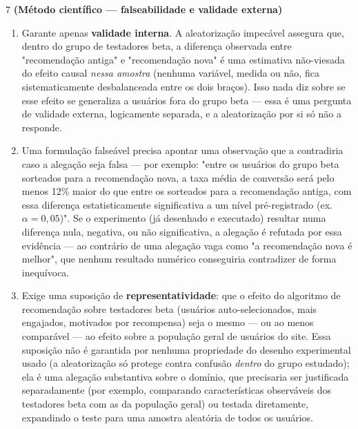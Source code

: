 \documentclass[11pt]{article}
\begin{document}
\begin{questao}{7} \textbf{(Método científico --- falseabilidade e validade externa)}
\end{questao}
\begin{solucao}
\begin{enumerate}[label=(\alph*)]
  \item Garante apenas \textbf{validade interna}. A aleatorização impecável assegura que, dentro
    do grupo de testadores beta, a diferença observada entre "recomendação antiga" e "recomendação
    nova" é uma estimativa não-viesada do efeito causal \emph{nessa amostra} (nenhuma variável,
    medida ou não, fica sistematicamente desbalanceada entre os dois braços). Isso nada diz sobre
    se esse efeito se generaliza a usuários fora do grupo beta --- essa é uma pergunta de validade
    externa, logicamente separada, e a aleatorização por si só não a responde.
  \item Uma formulação falseável precisa apontar uma observação que a contradiria caso a alegação
    seja falsa --- por exemplo: "entre os usuários do grupo beta sorteados para a recomendação
    nova, a taxa média de conversão será pelo menos 12\% maior do que entre os sorteados para a
    recomendação antiga, com essa diferença estatisticamente significativa a um nível pré-registrado
    (ex.\ $\alpha=0{,}05$)". Se o experimento (já desenhado e executado) resultar numa diferença
    nula, negativa, ou não significativa, a alegação é refutada por essa evidência --- ao contrário
    de uma alegação vaga como "a recomendação nova é melhor", que nenhum resultado numérico
    conseguiria contradizer de forma inequívoca.
  \item Exige uma suposição de \textbf{representatividade}: que o efeito do algoritmo de
    recomendação sobre testadores beta (usuários auto-selecionados, mais engajados, motivados por
    recompensa) seja o mesmo --- ou ao menos comparável --- ao efeito sobre a população geral de
    usuários do site. Essa suposição não é garantida por nenhuma propriedade do desenho
    experimental usado (a aleatorização só protege contra confusão \emph{dentro} do grupo estudado);
    ela é uma alegação substantiva sobre o domínio, que precisaria ser justificada separadamente
    (por exemplo, comparando características observáveis dos testadores beta com as da população
    geral) ou testada diretamente, expandindo o teste para uma amostra aleatória de todos os
    usuários.
\end{enumerate}
\end{solucao}
\end{document}
